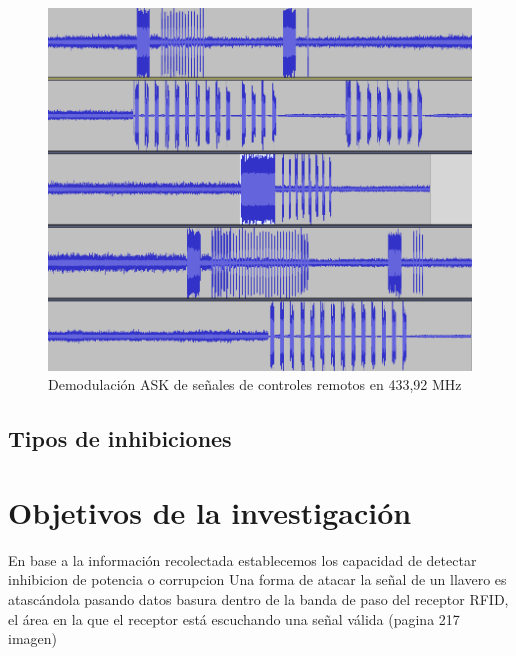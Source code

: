 \documentclass[12pt]{report}
\begin{document}
\begin{figure}[htb]
	\centering
	\includegraphics[scale=0.4]{llaves.png}
	\caption{Demodulación ASK de señales de controles remotos en 433,92 MHz}
	\label{llaves}
\end{figure}

\subsection{Tipos de inhibiciones}


\section{Objetivos de la investigación}
En base a la información recolectada establecemos los
capacidad de detectar inhibicion de potencia o corrupcion
Una forma de atacar la señal de un llavero es atascándola pasando datos basura dentro de la banda de paso del receptor RFID, 
el área en la que el receptor está escuchando una señal válida (pagina 217 imagen)




\pagebreak
\end{document}
